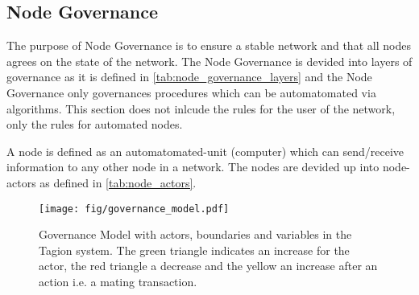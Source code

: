 \subsection{Node Governance} \label{sec:node_governance}
The purpose of Node Governance is to ensure a stable network and that all nodes agrees on the state of the network. The Node Governance is devided into layers of governance as it is defined in \cref{tab:node_governance_layers} and the Node Governance only governances procedures which can be automatomated via algorithms. This section does not inlcude the rules for the user of the network, only the rules for automated nodes. 


A node is defined as an automatomated-unit (computer) which can send/receive information to any other node in a network. The nodes are devided up into node-actors as defined in \cref{tab:node_actors}.


\begin{figure}[H]
 \centering
 \texttt{[image: fig/governance\_model.pdf]}
 \caption{Governance Model with actors, boundaries and variables in the Tagion system. The green triangle indicates an increase for the actor, the red triangle a decrease and the yellow an increase after an action i.e. a mating transaction.}
 \label{fig:governance_model}
\end{figure}


